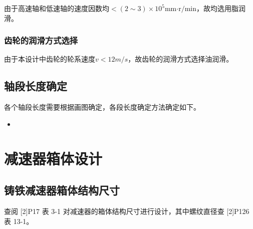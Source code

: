 \documentclass[12pt]{ctexart}
\begin{document}
由于高速轴和低速轴的速度因数均$<(2\sim 3)\times 10^5 \text{mm·r/min}$，故均选用脂润滑。

\subsubsection{齿轮的润滑方式选择}

由于本设计中齿轮的轮系速度$v<12m/s$，故齿轮的润滑方式选择油润滑。

\subsection{轴段长度确定}

各个轴段长度需要根据画图确定，各段长度确定方法确定如下。

\begin{itemize}
    \item 
\end{itemize}

\section{减速器箱体设计}
\subsection{铸铁减速器箱体结构尺寸}

查阅 [2]P17 表 3-1 对减速器的箱体结构尺寸进行设计，其中螺纹直径查 [2]P126 表 13-1。
\end{document}
